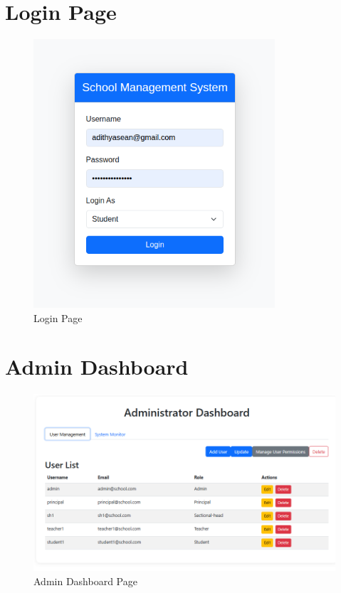 \documentclass[12pt,a4paper]{report}
\begin{document}
\section{Login Page}
\begin{figure}[htbp]
    \centering
    \includegraphics[width=0.8\textwidth]{login-page.png}
    \caption{Login Page}
    \label{fig:login-page}
\end{figure}

\section{Admin Dashboard}
\begin{figure}[htbp]
    \centering
    \includegraphics[width=1\textwidth]{admin-dashboard-page.png}
    \caption{Admin Dashboard Page}
    \label{fig:admin-dashboard-page}
\end{figure}
\end{document}
